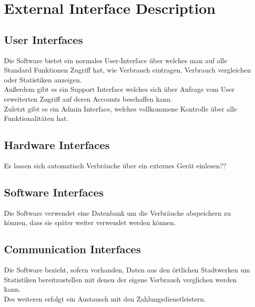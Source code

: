 \section{External Interface Description}
\subsection{User Interfaces}
Die Software bietet ein normales User-Interface über welches man auf alle Standard Funktionen Zugriff hat, wie Verbrauch eintragen, Verbrauch vergleichen oder Statistiken anzeigen.\\
Außerdem gibt es ein Support Interface welches sich über Anfrage vom User erweiterten Zugriff auf deren Accounts beschaffen kann.\\
Zuletzt gibt es ein Admin Interface, welches vollkommene Kontrolle über alle Funktionalitäten hat.
\subsection{Hardware Interfaces}
Es lassen sich automatisch Verbräuche über ein externes Gerät einlesen??
\subsection{Software Interfaces}
Die Software verwendet eine Datenbank um die Verbräuche abspeichern zu können, dass sie später weiter verwendet werden können.
\subsection{Communication Interfaces}
Die Software bezieht, sofern vorhanden, Daten aus den örtlichen Stadtwerken um Statistiken bereitzustellen mit denen der eigene Verbrauch verglichen werden kann.\\
Des weiteren erfolgt ein Austausch mit den Zahlungsdienstleistern.